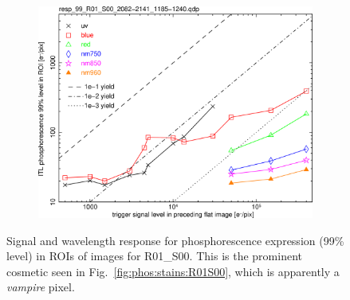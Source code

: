 \begin{figure}[!htbp]
\centering
\begin{subfigure}{0.45\textwidth}    
  \centering
  \includegraphics[width=\textwidth]{figures/phosphorescence-survey/phos_resp/resp_99_R01_S00_2082-2141_1185-1240.png}    
\end{subfigure}
\newline
\caption{Signal and wavelength response for phosphorescence expression (99\% level) in ROIs of images for R01\_S00. This is the prominent cosmetic seen in Fig.~\ref{fig:phos:stains:R01S00}, which is apparently a {\it vampire} pixel.}
\label{fig:phos:resp:R01S00}
\end{figure}

